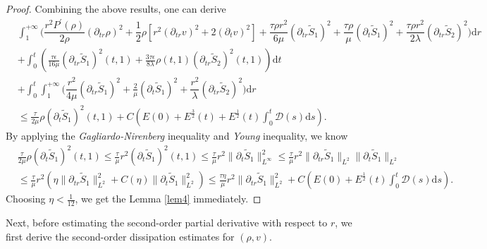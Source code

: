 \documentclass[10pt,reqno]{amsart}
\numberwithin{equation}{section}
\begin{document}
\begin{proof}
		Combining the above results, one can derive
		\begin{equation}\label{57}
			\begin{aligned}
				&\int_{1}^{+\infty}\bigg(\dfrac{r^2 P^{\prime}(\rho)}{2\rho} \left(\partial_{tr} \rho\right)^2 +\dfrac{1}{2}\rho\left[r^2 (\partial_{tr}v)^2+2 (\partial_{t}v)^2\right]
				+\dfrac{\tau\rho r^2}{6\mu}  (\partial_{tr}\tilde{S}_1)^2
				+\dfrac{\tau\rho }{\mu} (\partial_{t}\tilde{S}_1)^2
				+\dfrac{\tau\rho r^2}{2\lambda} (\partial_{tr} \tilde{S}_2)^2\bigg)\mathrm{d}r\\
				&+\int_{0}^{t}\left(\frac{\tau\epsilon}{16\mu} (\partial_{tr}\tilde{S}_1)^2(t,1)
				+\frac{3\tau\epsilon}{8\lambda}\rho(t,1)(\partial_{tr}\tilde{S}_2)^2(t,1)\right)\mathrm{d}t\\
				&+\int_{0}^{t}\int_{1}^{+\infty}\bigg(\dfrac{r^2}{4\mu}(\partial_{tr}\tilde{S}_1)^2+\frac{2}{\mu} (\partial_{t}\tilde{S}_1)^2
				+\dfrac{r^2}{\lambda}(\partial_{tr}\tilde{S}_2)^2\bigg)\mathrm{d}r\\
				&\leq \frac{\tau}{2\mu}\rho(\partial_{t}\tilde{S}_1)^2(t,1)+C\left(E(0)+E^{\frac{3}{2}}(t)+ E^{\frac{1}{2}}(t)\int_{0}^{t} \mathcal{D}(s)\mathrm{d}s\right).
			\end{aligned}
		\end{equation}
		By applying the {\it Gagliardo-Nirenberg} inequality and {\it Young} inequality, we know
		\begin{equation}
			\begin{aligned}\nonumber
				&\frac{\tau}{2\mu}\rho(\partial_{t}\tilde{S}_1)^2(t,1)
				\leq \frac{\tau}{\mu}r^2(\partial_{t}\tilde{S}_1)^2(t,1)
				\leq \frac{\tau}{\mu}r^2\|\partial_{t}\tilde{S}_1\|_{L^{\infty}}^2
				\leq\frac{\tau}{\mu}r^2\|\partial_{tr}\tilde{S}_1\|_{L^{2}}\|\partial_{t}\tilde{S}_1\|_{L^{2}}\\
				&\leq \frac{\tau}{\mu}r^2(\eta\|\partial_{tr}\tilde{S}_1\|_{L^{2}}^2+C(\eta)\|\partial_{t}\tilde{S}_1\|_{L^{2}}^2)
				\leq \frac{\tau\eta}{\mu} r^2\|\partial_{tr}\tilde{S}_1\|_{L^{2}}^2
				+C\left(E(0)+E^{\frac{1}{2}}(t) \int_{0}^t \mathcal{D}(s)\mathrm{d}s\right).
			\end{aligned}
		\end{equation}
		Choosing $\eta<\frac{1}{12}$, 
		we get the Lemma \ref{lem4} immediately.
	\end{proof}
	
	Next, before estimating the second-order partial derivative with respect to $r$, we first derive the second-order dissipation estimates for $(\rho, v)$.
	
\end{document}
